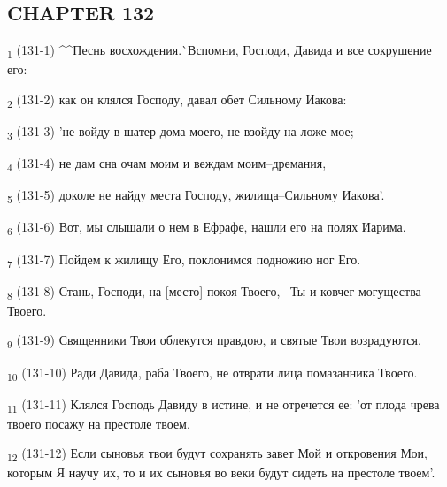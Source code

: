 \subsection{CHAPTER 132}
\begin{tcolorbox}
\textsubscript{1} (131-1) ^^Песнь восхождения.^^ Вспомни, Господи, Давида и все сокрушение его:
\end{tcolorbox}
\begin{tcolorbox}
\textsubscript{2} (131-2) как он клялся Господу, давал обет Сильному Иакова:
\end{tcolorbox}
\begin{tcolorbox}
\textsubscript{3} (131-3) 'не войду в шатер дома моего, не взойду на ложе мое;
\end{tcolorbox}
\begin{tcolorbox}
\textsubscript{4} (131-4) не дам сна очам моим и веждам моим--дремания,
\end{tcolorbox}
\begin{tcolorbox}
\textsubscript{5} (131-5) доколе не найду места Господу, жилища--Сильному Иакова'.
\end{tcolorbox}
\begin{tcolorbox}
\textsubscript{6} (131-6) Вот, мы слышали о нем в Ефрафе, нашли его на полях Иарима.
\end{tcolorbox}
\begin{tcolorbox}
\textsubscript{7} (131-7) Пойдем к жилищу Его, поклонимся подножию ног Его.
\end{tcolorbox}
\begin{tcolorbox}
\textsubscript{8} (131-8) Стань, Господи, на [место] покоя Твоего, --Ты и ковчег могущества Твоего.
\end{tcolorbox}
\begin{tcolorbox}
\textsubscript{9} (131-9) Священники Твои облекутся правдою, и святые Твои возрадуются.
\end{tcolorbox}
\begin{tcolorbox}
\textsubscript{10} (131-10) Ради Давида, раба Твоего, не отврати лица помазанника Твоего.
\end{tcolorbox}
\begin{tcolorbox}
\textsubscript{11} (131-11) Клялся Господь Давиду в истине, и не отречется ее: 'от плода чрева твоего посажу на престоле твоем.
\end{tcolorbox}
\begin{tcolorbox}
\textsubscript{12} (131-12) Если сыновья твои будут сохранять завет Мой и откровения Мои, которым Я научу их, то и их сыновья во веки будут сидеть на престоле твоем'.
\end{tcolorbox}
